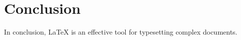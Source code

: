 
\section*{Conclusion}
In conclusion, LaTeX is an effective tool for typesetting complex documents.
    